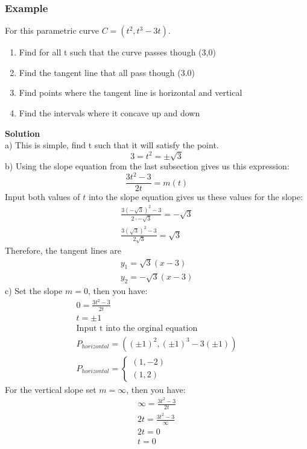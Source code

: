 \documentclass[./MATH-115-Notes.tex]{subfiles}
\begin{document}
\subsubsection{Example}
For this parametric curve $ C = (t^2, t^3 - 3t) $.
\begin{enumerate}[label=\alph*)]
    \item Find for all t such that the curve passes though (3,0)
    \item Find the tangent line that all pass though (3.0)
    \item Find points where the tangent line is horizontal and vertical
    \item Find the intervals where it concave up and down
\end{enumerate}
\textbf{Solution}\\
\noindent
a) This is simple, find t such that it will satisfy the point.
$$
    3 = t^2 = \pm \sqrt{3}
$$
b) Using the slope equation from the last subsection gives us this expression:
$$
    \frac{3t^2-3}{2t} = m(t)
$$
Input both values of $t$ into the slope equation gives us these values for the slope:
\begin{gather*}
    \frac{3(-\sqrt{3})^2-3}{2\cdot-\sqrt{3}} = -\sqrt{3}\\
    \frac{3(\sqrt{3})^2-3}{2\sqrt{3}} = \sqrt{3}
\end{gather*}
Therefore, the tangent lines are 
\begin{gather*}
    y_1 = \sqrt{3}(x - 3)\\
    y_2 = -\sqrt{3}(x - 3)
\end{gather*}
c) Set the slope $m = 0$, then you have:
\begin{gather*}
    0 = \frac{3t^2-3}{2t}\\
    t = \pm 1 \\
    \text{Input t into the orginal equation}\\
    P_{horizontal} = ( (\pm 1)^2 , (\pm 1)^3 - 3(\pm 1) )\\
    P_{horizontal} = 
    \begin{cases}
    (1, -2)\\
    (1, 2)    
    \end{cases}
\end{gather*}
For the vertical slope set $m = \infty$, then you have:
\begin{gather*}
    \infty =  \frac{3t^2-3}{2t}\\
    2t = \frac{3t^2-3}{\infty}\\
    2t = 0\\
    t = 0
\end{gather*} 
\end{document}
